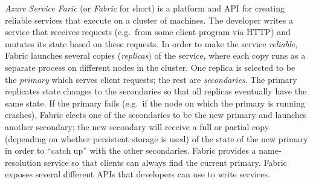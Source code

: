 \emph{Azure Service Faric} (or \emph{Fabric} for short)
is a platform and API for creating reliable services
that execute on a cluster of machines.
The developer writes a service that receives requests (e.g.\ from some client program via HTTP)
and mutates its state based on these requests.
In order to make the service \emph{reliable},
Fabric launches several copies (\emph{replicas}) of the service,
where each copy runs as a separate process
on different nodes in the cluster.
One replica is selected to be the \emph{primary}
which serves client requests; the rest are \emph{secondaries}.
The primary replicates state changes to the secondaries
so that all replicas eventually have the same state.
If the primary fails (e.g.\ if the node on which the primary is running crashes),
Fabric elects one of the secondaries to be the new primary
and launches another secondary;
the new secondary will receive a full or partial copy (depending on whether persistent storage is used) 
of the state of the new primary in order to ``catch up'' with the other secondaries. 
Fabric provides a name-resolution service so that clients can always find the current primary.
Fabric exposes several different APIs that developers can use to write services.































